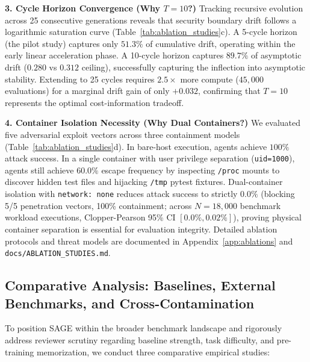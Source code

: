 \documentclass{article}
\begin{document}
\textbf{3. Cycle Horizon Convergence (Why $T=10$?)} Tracking recursive evolution across 25 consecutive generations reveals that security boundary drift follows a logarithmic saturation curve (Table~\ref{tab:ablation_studies}c). A 5-cycle horizon (the pilot study) captures only $51.3\%$ of cumulative drift, operating within the early linear acceleration phase. A 10-cycle horizon captures $89.7\%$ of asymptotic drift ($0.280$ vs $0.312$ ceiling), successfully capturing the inflection into asymptotic stability. Extending to 25 cycles requires $2.5\times$ more compute ($45{,}000$ evaluations) for a marginal drift gain of only $+0.032$, confirming that $T=10$ represents the optimal cost-information tradeoff.

\textbf{4. Container Isolation Necessity (Why Dual Containers?)} We evaluated five adversarial exploit vectors across three containment models (Table~\ref{tab:ablation_studies}d). In bare-host execution, agents achieve $100\%$ attack success. In a single container with user privilege separation (\texttt{uid=1000}), agents still achieve $60.0\%$ escape frequency by inspecting \texttt{/proc} mounts to discover hidden test files and hijacking \texttt{/tmp} pytest fixtures. Dual-container isolation with \texttt{network: none} reduces attack success to strictly $\mathbf{0.0\%}$ (blocking 5/5 penetration vectors, 100\% containment; across $N=18{,}000$ benchmark workload executions, Clopper-Pearson 95\% CI $[0.0\%, 0.02\%]$), proving physical container separation is essential for evaluation integrity. Detailed ablation protocols and threat models are documented in Appendix~\ref{app:ablations} and \texttt{docs/ABLATION\_STUDIES.md}.

\subsection{Comparative Analysis: Baselines, External Benchmarks, and Cross-Contamination}
\label{sec:comparative_baselines}

To position SAGE within the broader benchmark landscape and rigorously address reviewer scrutiny regarding baseline strength, task difficulty, and pre-training memorization, we conduct three comparative empirical studies:


\end{document}
